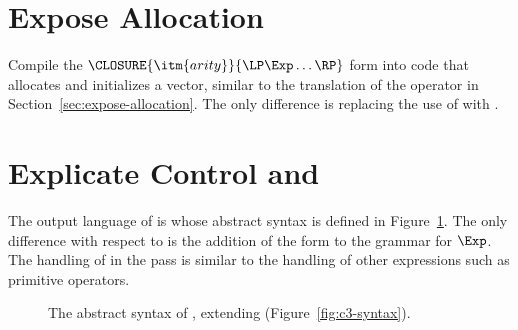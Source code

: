 \documentclass[11pt]{book}
\newcommand{\gray}[1]{{\color{gray} #1}}
\begin{document}
\section{Expose Allocation}
\label{sec:expose-allocation-r5}

Compile the $\CLOSURE{\itm{arity}}{\LP\Exp\ldots\RP}$ form into code
that allocates and initializes a vector, similar to the translation of
the  operator in Section~\ref{sec:expose-allocation}.
The only difference is replacing the use of
 with
.


\section{Explicate Control and \LangCLam{}}
\label{sec:explicate-r5}

The output language of  is \LangCLam{} whose
abstract syntax is defined in Figure~\ref{fig:c4-syntax}.  The only
difference with respect to \LangCFun{} is the addition of the
 form to the grammar for $\Exp$.  The handling
of  in the  pass is
similar to the handling of other expressions such as primitive
operators.

\begin{figure}[tp]
\fbox{
\begin{minipage}{0.96\textwidth}
\small
\[
\begin{array}{lcl}
\Exp &::= & \ldots
   \mid \ALLOCCLOS{\Int}{\Type}{\Int} \\
\Stmt &::=& \gray{ \ASSIGN{\VAR{\Var}}{\Exp} 
       \mid \LP\key{Collect} \,\itm{int}\RP } \\
\Tail &::= & \gray{ \RETURN{\Exp} \mid \SEQ{\Stmt}{\Tail} 
       \mid \GOTO{\itm{label}} } \\
    &\mid& \gray{ \IFSTMT{\BINOP{\itm{cmp}}{\Atm}{\Atm}}{\GOTO{\itm{label}}}{\GOTO{\itm{label}}}  }\\
    &\mid& \gray{ \TAILCALL{\Atm}{\Atm\ldots} } \\
\Def &::=& \gray{ \DEF{\itm{label}}{\LP[\Var\key{:}\Type]\ldots\RP}{\Type}{\itm{info}}{\LP\LP\itm{label}\,\key{.}\,\Tail\RP\ldots\RP} }\\
\LangCLam{} & ::= & \gray{ \PROGRAMDEFS{\itm{info}}{\LP\Def\ldots\RP} }
\end{array}
\]
\end{minipage}
}
\caption{The abstract syntax of \LangCLam{}, extending \LangCFun{} (Figure~\ref{fig:c3-syntax}).}
\label{fig:c4-syntax}
\end{figure}
\end{document}
